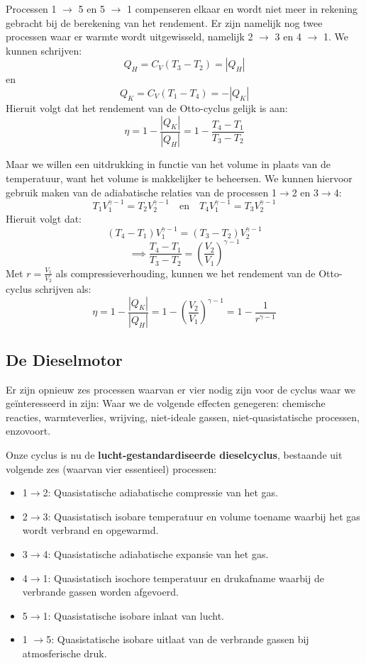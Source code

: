 Processen 1 \(\to\) 5 en 5 \(\to \) 1 compenseren elkaar en wordt niet meer in rekening gebracht bij de berekening van het rendement.
Er zijn namelijk nog twee processen waar er warmte wordt uitgewisseld, namelijk 2 \(\to\) 3 en 4 \(\to\) 1.
We kunnen schrijven:
\[Q_H = C_V (T_3-T_2) = |Q_H|\]
en
\[Q_K = C_V (T_1-T_4) = -|Q_K|\]
Hieruit volgt dat het rendement van de Otto-cyclus gelijk is aan:
\[\eta = 1 - \frac{|Q_K|}{|Q_H|} = 1 - \frac{T_4-T_1}{T_3-T_2}\]

Maar we willen een uitdrukking in functie van het volume in plaats van de temperatuur, want het volume is makkelijker te beheersen.
We kunnen hiervoor gebruik maken van de adiabatische relaties van de processen 1\(\to\)2 en 3\(\to\)4:
\[T_1 V_1^{\gamma - 1} = T_2 V_2^{\gamma - 1} \quad \text{en} \quad T_4 V_1^{\gamma - 1} = T_3 V_2^{\gamma - 1}\]
Hieruit volgt dat:
\[(T_4-T_1)V_1^{\gamma - 1} = (T_3-T_2)V_2^{\gamma - 1}\]
\[\implies \frac{T_4-T_1}{T_3-T_2} = \left(\frac{V_2}{V_1}\right)^{\gamma - 1}\]
Met \(r = \frac{V_1}{V_2}\) als compressieverhouding, kunnen we het rendement van de Otto-cyclus schrijven als:
\[\eta = 1 - \frac{|Q_K|}{|Q_H|} = 1 - \left(\frac{V_2}{V_1}\right)^{\gamma - 1} = 1 - \frac{1}{r^{\gamma - 1}}\]

\subsection{De Dieselmotor}

Er zijn opnieuw zes processen waarvan er vier nodig zijn voor de cyclus waar we geïnteresseerd in zijn:
Waar we de volgende effecten genegeren: chemische reacties, warmteverlies, wrijving, niet-ideale gassen, niet-quasistatische processen, enzovoort.

Onze cyclus is nu de \textbf{lucht-gestandardiseerde dieselcyclus}, bestaande uit volgende zes (waarvan vier essentieel) processen:
\begin{itemize}
    \item 1\(\to\)2: Quasistatische adiabatische compressie van het gas.
    \item 2\(\to\)3: Quasistatisch isobare temperatuur en volume toename waarbij het gas wordt verbrand en opgewarmd.
    \item 3\(\to\)4: Quasistatische adiabatische expansie van het gas.
    \item 4\(\to\)1: Quasistatisch isochore temperatuur en drukafname waarbij de verbrande gassen worden afgevoerd.
    \item 5\(\to\)1: Quasistatische isobare inlaat van lucht.
    \item 1 \(\to\)5: Quasistatische isobare uitlaat van de verbrande gassen bij atmosferische druk.
\end{itemize}

